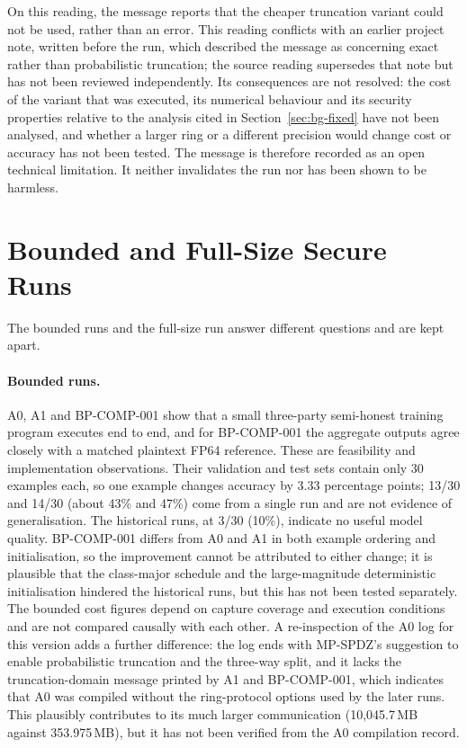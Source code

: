 On this reading, the message reports that the cheaper truncation variant could not be used, rather than an error. This reading conflicts with an earlier project note, written before the run, which described the message as concerning exact rather than probabilistic truncation; the source reading supersedes that note but has not been reviewed independently. Its consequences are not resolved: the cost of the variant that was executed, its numerical behaviour and its security properties relative to the analysis cited in Section~\ref{sec:bg-fixed} have not been analysed, and whether a larger ring or a different precision would change cost or accuracy has not been tested. The message is therefore recorded as an open technical limitation. It neither invalidates the run nor has been shown to be harmless.

\section{Bounded and Full-Size Secure Runs}\label{sec:disc-bounded}
The bounded runs and the full-size run answer different questions and are kept apart.

\paragraph{Bounded runs.} A0, A1 and BP-COMP-001 show that a small three-party semi-honest training program executes end to end, and for BP-COMP-001 the aggregate outputs agree closely with a matched plaintext FP64 reference. These are feasibility and implementation observations. Their validation and test sets contain only 30 examples each, so one example changes accuracy by $3.33$ percentage points; 13/30 and 14/30 (about 43\% and 47\%) come from a single run and are not evidence of generalisation. The historical runs, at 3/30 (10\%), indicate no useful model quality. BP-COMP-001 differs from A0 and A1 in both example ordering and initialisation, so the improvement cannot be attributed to either change; it is plausible that the class-major schedule and the large-magnitude deterministic initialisation hindered the historical runs, but this has not been tested separately. The bounded cost figures depend on capture coverage and execution conditions and are not compared causally with each other. A re-inspection of the A0 log for this version adds a further difference: the log ends with MP-SPDZ's suggestion to enable probabilistic truncation and the three-way split, and it lacks the truncation-domain message printed by A1 and BP-COMP-001, which indicates that A0 was compiled without the ring-protocol options used by the later runs. This plausibly contributes to its much larger communication (10{,}045.7\,MB against 353.975\,MB), but it has not been verified from the A0 compilation record.

